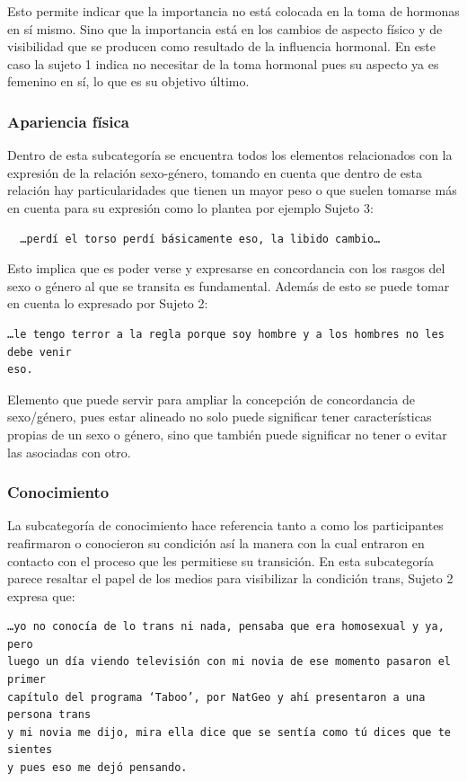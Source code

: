 Esto permite indicar que la importancia no está colocada en la toma de hormonas
en sí mismo. Sino que la importancia está en los cambios de aspecto físico y de
visibilidad que se producen como resultado de la influencia hormonal. En este
caso la sujeto 1 indica no necesitar de la toma hormonal pues su aspecto ya es
femenino en sí, lo que es su objetivo último.

\subsubsection{Apariencia física}

Dentro de esta subcategoría se encuentra todos los elementos relacionados con la
expresión de la relación sexo-género, tomando en cuenta que dentro de esta
relación hay particularidades que tienen un mayor peso o que suelen tomarse más
en cuenta para su expresión como lo plantea por ejemplo Sujeto 3:

\begin{verbatim}
  …perdí el torso perdí básicamente eso, la libido cambio…
\end{verbatim}

Esto implica que es poder verse y expresarse en concordancia con los
rasgos del sexo o género al que se transita es fundamental. Además de esto se
puede tomar en cuenta lo expresado por Sujeto 2:

\begin{verbatim}
…le tengo terror a la regla porque soy hombre y a los hombres no les debe venir
eso.
\end{verbatim}

Elemento que puede servir para ampliar la concepción de concordancia de
sexo/género, pues estar alineado no solo puede significar tener características
propias de un sexo o género, sino que también puede significar no tener o evitar
las asociadas con otro.

\subsubsection{Conocimiento}

La subcategoría de conocimiento hace referencia tanto a como los participantes
reafirmaron o conocieron su condición así la manera con la cual entraron en
contacto con el proceso que les permitiese su transición. En esta subcategoría
parece resaltar el papel de los medios para visibilizar la condición trans,
Sujeto 2 expresa que:

\begin{verbatim}
…yo no conocía de lo trans ni nada, pensaba que era homosexual y ya, pero
luego un día viendo televisión con mi novia de ese momento pasaron el primer
capítulo del programa ‘Taboo’, por NatGeo y ahí presentaron a una persona trans
y mi novia me dijo, mira ella dice que se sentía como tú dices que te sientes
y pues eso me dejó pensando.
\end{verbatim}

